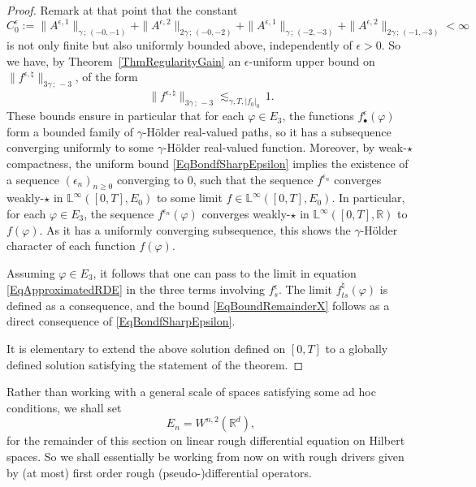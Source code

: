\documentclass[11pt,a4paper]{amsart}
\newcommand{\RR}{\mathbb{R}}  \newcommand{\CC}{\mathbb{C}}  \newcommand{\LL}{\mathbb{L}}  \newcommand{\WW}{\mathbb{W}}
\renewcommand{\geq}{\geqslant}
\theoremstyle{plain}%
\theoremstyle{definition}
\theoremstyle{remark}
\numberwithin{equation}{section} %
\begin{document}
\begin{proof}
\smallskip

Remark at that point that the constant 
\begin{equation*}
C^\epsilon_0 := \|A^{\epsilon,1}\|_{\gamma\,;\,(-0,-1)}  + \|A^{\epsilon,2}\|_{2\gamma\,;\,(-0,-2)} +  \|A^{\epsilon,1}\|_{\gamma\,;\,(-2,-3)}  + \|A^{\epsilon,2}\|_{2\gamma\,;\,(-1,-3)}  < \infty
\end{equation*}
is not only finite but also uniformly bounded above, independently of $\epsilon>0$. So we have, by Theorem~\ref{ThmRegularityGain}  an $\epsilon$-uniform upper bound on $\|f^{\epsilon,\natural}\|_{3\gamma\,;\,-3}$, of the form
\begin{equation}
\label{EqBondfSharpEpsilon}
\|f^{\epsilon,\natural}\|_{3\gamma\,;\,-3} \lesssim_{\gamma,T,| f_0|_0}\,1. 
\end{equation}
These bounds ensure in particular that for each $\varphi\in E_3$, the functions $f^\epsilon_\bullet(\varphi)$ form a bounded family of $\gamma$-H\"older real-valued paths, so it has a subsequence converging uniformly to some $\gamma$-H\"older real-valued function. Moreover, by weak-$\star$ compactness, the uniform bound \eqref{EqBondfSharpEpsilon} implies the existence of a sequence $(\epsilon_n)_{n\geq 0}$ converging to $0$, such that the sequence $f^{\epsilon_n}$ converges weakly-$\star$ in $\LL^\infty([0,T],E_0)$ to some limit $f\in\LL^\infty([0,T],E_0)$. In particular, for each $\varphi\in E_3$, the sequence $f^{\epsilon_n}(\varphi)$ converges weakly-$\star$ in $\LL^\infty([0,T],\RR)$ to $f(\varphi)$. As it has a uniformly converging subsequence, this shows the $\gamma$-H\"older character of each function $f(\varphi)$. 

Assuming $\varphi\in E_3$, it follows that one can pass to the limit in equation \eqref{EqApproximatedRDE} in the three terms involving $f^\epsilon_s$. The limit $f^\natural_{ts}(\varphi)$ is defined as a consequence, and the bound \eqref{EqBoundRemainderX} follows as a direct consequence of \eqref{EqBondfSharpEpsilon}.

\smallskip 

It is elementary to extend the above solution defined on $[0,T]$ to a globally defined solution satisfying the statement of the theorem.
\end{proof}

\bigskip

Rather than working with a general scale of spaces satisfying some ad hoc conditions, we shall set 
$$
E_n = W^{n,2}(\RR^d),
$$
for the remainder of this section on linear rough differential equation on Hilbert spaces. So we shall essentially be working from now on with rough drivers given by (at most) first order rough (pseudo-)differential operators. 
\end{document}

